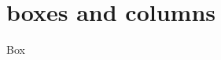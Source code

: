 \section{boxes and columns}
 \frame{\sectionpage}
 
\begin{frame}{Box}
    \begin{center}
        \textcolor{yellow}{} 

    \bigskip    
    
    \fbox{\parbox{\textwidth}{A big box\\ %
    é denso em \([0,1)\). }}
 \end{center}
\end{frame}
    
%
%
%
%
%
%
%
%
%
%
    
